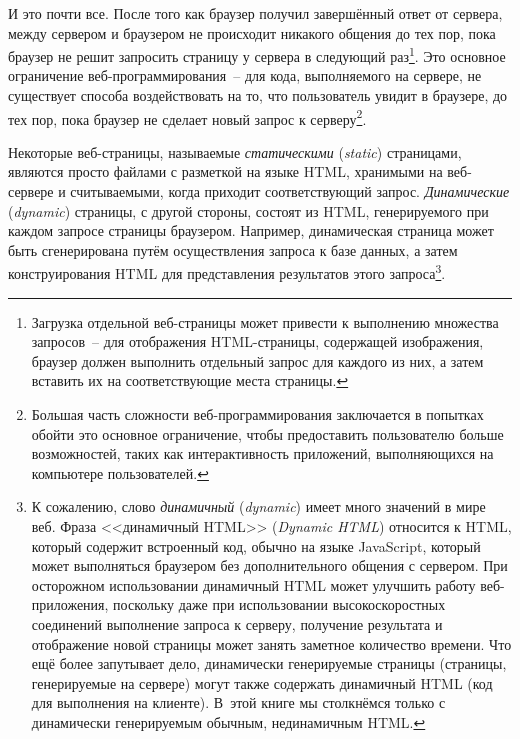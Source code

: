 И это почти все. После того как браузер получил завершённый ответ от сервера, между
сервером и браузером не происходит никакого общения до тех пор, пока браузер не решит
запросить страницу у сервера в следующий раз\footnote{Загрузка отдельной веб-страницы
  может привести к выполнению множества запросов~-- для отображения HTML-страницы,
  содержащей изображения, браузер должен выполнить отдельный запрос для каждого из них, а
  затем вставить их на соответствующие места страницы.}. Это основное ограничение
веб-программирования~-- для кода, выполняемого на сервере, не существует способа
воздействовать на то, что пользователь увидит в браузере, до тех пор, пока браузер не
сделает новый запрос к серверу\footnote{Большая часть сложности веб-программирования
  заключается в попытках обойти это основное ограничение, чтобы предоставить пользователю
  больше возможностей, таких как интерактивность приложений, выполняющихся на компьютере
  пользователей.}.

Некоторые веб-страницы, называемые \textit{статическими} (\textit{static}) страницами,
являются просто файлами с разметкой на языке HTML, хранимыми на веб-сервере и считываемыми,
когда приходит соответствующий запрос. \textit{Динамические} (\textit{dynamic}) страницы,
с другой стороны, состоят из HTML, генерируемого при каждом запросе страницы
браузером. Например, динамическая страница может быть сгенерирована путём осуществления
запроса к базе данных, а затем конструирования HTML для представления результатов этого
запроса\footnote{К сожалению, слово \textit{динамичный} (\textit{dynamic}) имеет много
  значений в мире веб. Фраза <<динамичный HTML>> (\textit{Dynamic HTML}) относится к HTML,
  который содержит встроенный код, обычно на языке JavaScript, который может выполняться
  браузером без дополнительного общения с сервером. При осторожном использовании
  динамичный HTML может улучшить работу веб-приложения, поскольку даже при использовании
  высокоскоростных соединений выполнение запроса к серверу, получение результата и
  отображение новой страницы может занять заметное количество времени. Что ещё более
  запутывает дело, динамически генерируемые страницы (страницы, генерируемые на сервере)
  могут также содержать динамичный HTML (код для выполнения на клиенте). В~этой книге мы
  столкнёмся только с динамически генерируемым обычным, нединамичным HTML.}.

